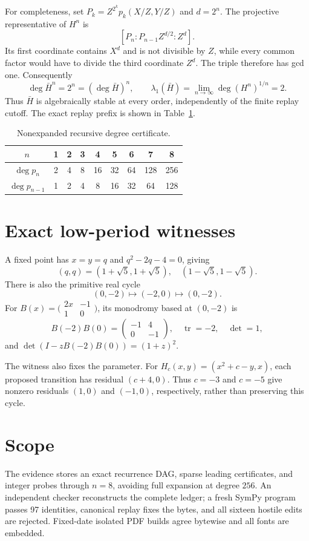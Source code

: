 \documentclass[10pt]{article}
\begin{document}
For completeness, set $P_k=Z^{2^k}p_k(X/Z,Y/Z)$ and $d=2^n$.  The
projective representative of $H^n$ is
\[
 [P_n:P_{n-1}Z^{d/2}:Z^d].
\]
Its first coordinate contains $X^d$ and is not divisible by $Z$, while every
common factor would have to divide the third coordinate $Z^d$.  The triple
therefore has gcd one.  Consequently
\[
 \deg \bar H^n=2^n=(\deg\bar H)^n,\qquad
 \lambda_1(\bar H)=\lim_{n\to\infty}\deg(H^n)^{1/n}=2.
\]
Thus $\bar H$ is algebraically stable at every order, independently of the
finite replay cutoff.
The exact replay prefix is shown in Table~\ref{tab:degrees}.
\begin{table}[ht]
\centering
\small
\caption{Nonexpanded recursive degree certificate.}
\label{tab:degrees}
\begin{tabular}{@{}c*{8}{c}@{}}
\toprule
$n$&1&2&3&4&5&6&7&8\\
\midrule
$\deg p_n$&2&4&8&16&32&64&128&256\\
$\deg p_{n-1}$&1&2&4&8&16&32&64&128\\
\bottomrule
\end{tabular}
\end{table}

\section{Exact low-period witnesses}
A fixed point has $x=y=q$ and $q^2-2q-4=0$, giving
\[
 (q,q)=(1+\sqrt5,1+\sqrt5),\quad(1-\sqrt5,1-\sqrt5).
\]
There is also the primitive real cycle
\[
 (0,-2)\longmapsto(-2,0)\longmapsto(0,-2).
\]
For $B(x)=\bigl(\begin{smallmatrix}2x&-1\\1&0\end{smallmatrix}\bigr)$, its monodromy
based at $(0,-2)$ is
\[
 B(-2)B(0)=\begin{pmatrix}-1&4\\0&-1\end{pmatrix},\quad
 \operatorname{tr}=-2,\quad\det=1,
\]
and $\det(I-zB(-2)B(0))=(1+z)^2$.

The witness also fixes the parameter.  For
$H_c(x,y)=(x^2+c-y,x)$, each proposed transition has residual $(c+4,0)$.
Thus $c=-3$ and $c=-5$ give nonzero residuals $(1,0)$ and $(-1,0)$,
respectively, rather than preserving this cycle.

\section{Scope}
The evidence stores an exact recurrence DAG, sparse leading certificates, and
integer probes through $n=8$, avoiding full expansion at degree $256$.  An
independent checker reconstructs the complete ledger; a fresh SymPy program
passes 97 identities, canonical replay fixes the bytes, and all sixteen
hostile edits are rejected.  Fixed-date isolated PDF builds agree bytewise and
all fonts are embedded.
\end{document}
